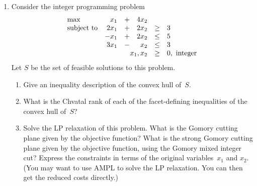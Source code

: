 \documentclass[12pt]{article}
\begin{document}
\begin{enumerate}
\item Consider the integer programming problem
\begin{displaymath}
\begin{array}{lrcrcl}
\max & x_1 & + & 4x_2  \\
\mbox{subject to} & 2x_1 & + & 2x_2 & \geq & 3 \\
& -x_1 & + & 2x_2 & \leq & 5  \\
& 3x_1 & - & x_2 & \leq & 3  \\
& \multicolumn{3}{r}{x_1, x_2} & \geq & 0, \mbox{ integer} 
\end{array}
\end{displaymath}
Let $S$ be the set of feasible solutions to this problem.
\begin{enumerate}
\item Give an inequality description of the convex hull of~$S$.
\item What is the Chvatal rank of each of the facet-defining inequalities
of the convex hull of~$S$?
\item Solve the LP relaxation of this problem.
What is the Gomory cutting plane given by the objective function?
What is the strong Gomory cutting plane given by the objective function,
using the Gomory mixed integer cut?
Express the constraints in terms of the original variables~$x_1$ and $x_2$.
(You may want to use AMPL to solve the LP relaxation.
You can then get the reduced costs directly.)
\end{enumerate}


\end{enumerate}
\end{document}
